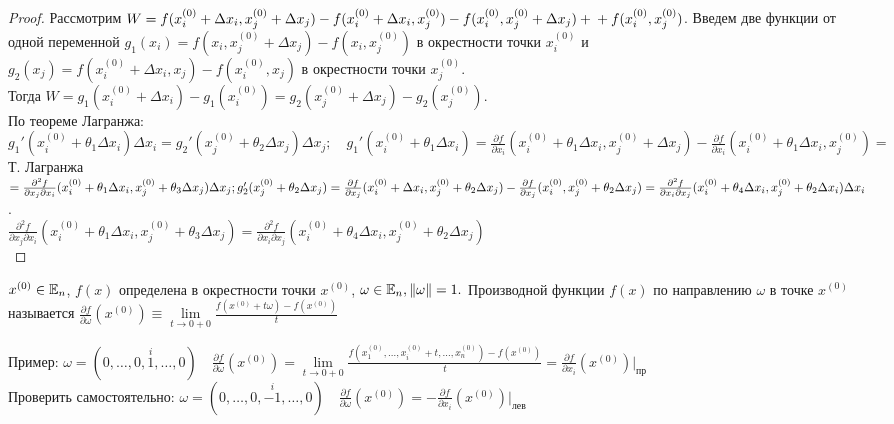 \documentclass[../main.tex]{subfiles}
\begin{document}
\begin{proof}
    Рассмотрим $W = f(x_{i}^{(0)}+\Delta x_{i}, x_{j}^{(0)}+\Delta x_{j}) - f(x_{i}^{(0)}+\Delta x_{i}, x_{j}^{(0)}) - f(x_{i}^{(0)}, x_{j}^{(0)}+\Delta x_{j}) +\\+ f(x_{i}^{(0)}, x_{j}^{(0)})$. Введем две функции от одной переменной $g_{1}(x_{i}) = f(x_{i}, x_{j}^{(0)}+\Delta x_{j}) - f(x_{i}, x_{j}^{(0)})$ в окрестности точки $x_{i}^{(0)}$ и $g_{2}(x_{j}) = f(x_{i}^{(0)}+\Delta x_{i}, x_{j}) - f(x_{i}^{(0)}, x_{j})$ в окрестности точки $x_{j}^{(0)}$.\\ Тогда $W = g_{1}(x_{i}^{(0)}+\Delta x_{i}) - g_{1}(x_{i}^{(0)}) = g_{2}(x_{j}^{(0)}+\Delta x_{j}) - g_{2}(x_{j}^{(0)})$.
    \\По теореме Лагранжа: $g_{1}' (x_{i}^{(0)}+\theta_{1} \Delta x_{i})\Delta x_{i} = g_{2}'(x_{j}^{(0)}+\theta_{2} \Delta x_{j})\Delta x_{j}; \quad g_{1}'(x_{i}^{(0)} + \theta_{1} \Delta x_{i}) = \frac{\partial{f}}{\partial{x_{i}}}(x_{i}^{(0)}+\theta_{1} \Delta x_{i}, x_{j}^{(0)}+\Delta x_{j}) -  \frac{\partial{f}}{\partial{x_{i}}}(x_{i}^{(0)}+\theta_{1} \Delta x_{i}, x_{j}^{(0)}) =$ Т. Лагранжа $= \frac{\partial^{2}{f}}{\partial{x_{j}}\partial{x_{i}}}(x_{i}^{(0)}+\theta_{1} \Delta x_{i}, x_{j}^{(0)}+\theta_{3} \Delta x_{j})\Delta x_{j} ;
    \\ g'_{2}(x_{j}^{(0)}+\theta_{2} \Delta x_{j}) = \frac{\partial{f}}{\partial{x_{j}}}(x_{i}^{(0)}+\Delta x_{i }, x_{j}^{(0)}+\theta_{2} \Delta x_{j}) - \frac{\partial{f}}{\partial{x_{j}}}(x_{i}^{(0)}, x_{j}^{(0)}+\theta_{2} \Delta x_{j}) = \frac{\partial^{2}{f}}{\partial{x_{i}}\partial{x_{j}}}(x_{i}^{(0)}+\theta_{4} \Delta x_{i}, x_{j}^{(0)}+\theta_{2} \Delta x_{i})\Delta x_{i}$.\\
    $\frac{\partial^{2}{f}}{\partial{x_{j}}\partial{x_{i}}}(x_{i}^{(0)}+\theta_{1} \Delta x_{i}, x_{j}^{(0)}+\theta_{3} \Delta x_{j})= \frac{\partial^{2}{f}}{\partial{x_{i}}\partial{x_{j}}}(x_{i}^{(0)}+\theta_{4} \Delta x_{i}, x_{j}^{(0)}+\theta_{2} \Delta x_{j})$\\
\end{proof}
\begin{definition}
    $x^{(0)}\in \mathbb{E}_{n}$, $f(x)$ определена в окрестности точки $x^{(0)}$, $\omega \in \mathbb{E}_{n}, \| \omega \| =1.$ Производной функции $f(x)$ по направлению $\omega$ в точке $x^{(0)}$ называется $\frac{\partial{f}}{\partial{\omega}}(x^{(0)}) \equiv \lim\limits_{t \to 0+0} \frac{f(x^{(0)}+t\omega)-f(x^{(0)})}{t}$
\end{definition}
\vspace{0.5cm}
Пример: $\omega = (0,\dots,0,\overset{i}{1},\dots,0) \quad \frac{\partial{f}}{\partial{\omega}}(x^{(0)}) = \lim\limits_{t\to 0+0} \frac{f(x_{1}^{(0)},\dots,x_{i}^{(0)}+t,\dots,x_{n}^{(0)})-f(x^{(0)})}{t} = \frac{\partial{f}}{\partial{x_{i}}}(x^{(0)})\bigg|_{\text{пр}}$
\\Проверить самостоятельно: $\omega =(0,\dots,0,\overset{i}{-1},\dots,0) \quad \frac{\partial{f}}{\partial{\omega}}(x^{(0)}) = - \frac{\partial{f}}{\partial{x_{i}}}(x^{(0)})\bigg|_{\text{лев}}$
\vspace{1cm}
\end{document}

